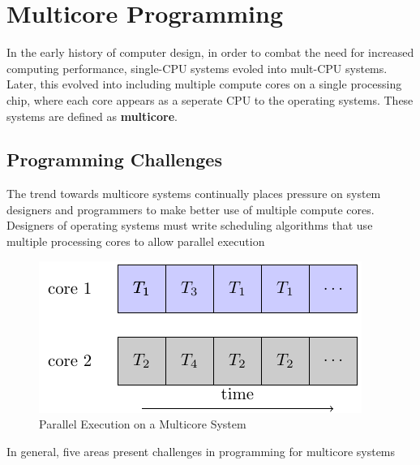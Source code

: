 \documentclass{book/custombook}
\begin{document}
        \section{Multicore Programming}
            In the early history of computer design, in order to combat the need for increased computing performance, single-CPU systems
            evoled into mult-CPU systems. Later, this evolved into including multiple compute cores on a single processing chip, where each core
            appears as a seperate CPU to the operating systems. These systems are defined as \textbf{multicore}.
            \subsection{Programming Challenges}
                The trend towards multicore systems continually places pressure on system designers and programmers to make better use of
                multiple compute cores. Designers of operating systems must write scheduling algorithms that use multiple processing cores
                to allow parallel execution
                \begin{figure}[H]
                    \centering
                    \includegraphics{figures/multicore_exec.pdf}
                    \caption{Parallel Execution on a Multicore System}
                \end{figure}
            In general, five areas present challenges in programming for multicore systems
\end{document}
